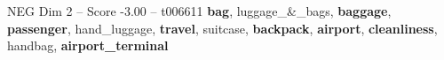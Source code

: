 \begin{textsample}{NEG Dim 2 – Score -3.00 – t006611}  \label{ex:f2_neg_040}
\textbf{bag}, luggage\_\&\_bags, \textbf{baggage}, \textbf{passenger}, hand\_luggage, \textbf{travel}, suitcase, \textbf{backpack}, \textbf{airport}, \textbf{cleanliness}, handbag, \textbf{airport\_terminal}

\end{textsample}
